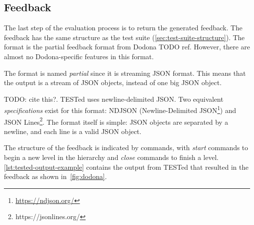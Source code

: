 \documentclass[../main]{subfiles}
\begin{document}
\subsection{Feedback}\label{subsec:feedback}

The last step of the evaluation process is to return the generated feedback.
The feedback has the same structure as the test suite (\cref{sec:test-suite-structure}).
The format is the partial feedback format from Dodona TODO ref.
However, there are almost no Dodona-specific features in this format.

The format is named \emph{partial} since it is streaming JSON format.
This means that the output is a stream of JSON objects, instead of one big JSON object.

TODO: cite this?.
TESTed uses newline-delimited JSON\@.
Two equivalent \emph{specifications} exist for this format: NDJSON (Newline-Delimited JSON\footnote{\url{https://ndjson.org/}}) and JSON Lines\footnote{https://jsonlines.org/}.
The format itself is simple: JSON objects are separated by a newline, and each line is a valid JSON object.

The structure of the feedback is indicated by commands, with \emph{start} commands to begin a new level in the hierarchy and \emph{close} commands to finish a level.
\cref{lst:tested-output-example} contains the output from TESTed that resulted in the feedback as shown in~\cref{fig:dodona}.
\end{document}
